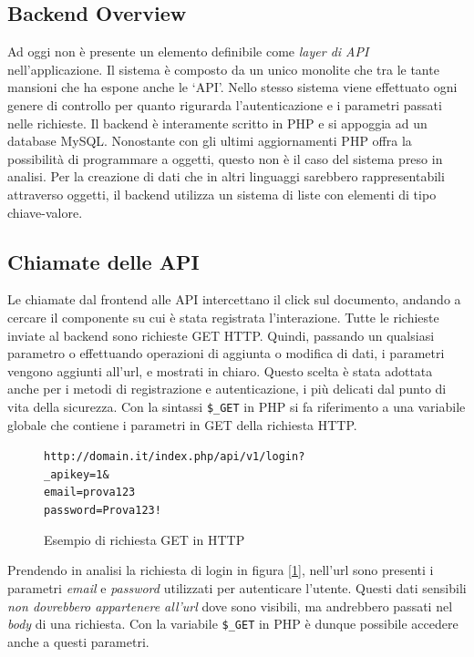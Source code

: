\subsection{Backend Overview}
Ad oggi non è presente un elemento definibile come \emph{layer di API} nell’applicazione. Il sistema è composto da un unico monolite che tra le tante mansioni che ha espone anche le `API'. Nello stesso sistema viene effettuato ogni genere di controllo per quanto rigurarda l'autenticazione e i parametri passati nelle richieste. Il backend è interamente scritto in PHP e si appoggia ad un database MySQL. Nonostante con gli ultimi aggiornamenti PHP offra la possibilità di programmare a oggetti, questo non è il caso del sistema preso in analisi. Per la creazione di dati che in altri linguaggi sarebbero rappresentabili attraverso oggetti, il backend utilizza un sistema di liste con elementi di tipo chiave-valore.

\subsection{Chiamate delle API}
Le chiamate dal frontend alle API intercettano il click sul documento, andando a cercare il componente su cui è stata registrata l'interazione. Tutte le richieste inviate al backend sono richieste GET HTTP. Quindi, passando un qualsiasi parametro o effettuando operazioni di aggiunta o modifica di dati, i parametri vengono aggiunti all'url, e mostrati in chiaro. Questo scelta è stata adottata anche per i metodi di registrazione e autenticazione, i più delicati dal punto di vita della sicurezza. Con la sintassi \texttt{\$\_GET} in PHP si fa riferimento a una variabile globale che contiene i parametri in GET della richiesta HTTP.
\begin{figure}[H]
\begin{alltt}
    \centering
    http://domain.it/index.php/api/v1/login?
    \centering
    _apikey=1&
    email=prova123%
    password=Prova123!
\end{alltt}
\caption{Esempio di richiesta GET in HTTP}
\label{fig:getlogin}
\end{figure}
Prendendo in analisi la richiesta di login in figura [\ref{fig:getlogin}], nell'url sono presenti i parametri \textsl{email} e \textsl{password} utilizzati per autenticare l'utente. Questi dati sensibili \textit{non dovrebbero appartenere all'url} dove sono visibili, ma andrebbero passati nel \emph{body} di una richiesta. Con la variabile \texttt{\$\_GET} in PHP è dunque possibile accedere anche a questi parametri.

